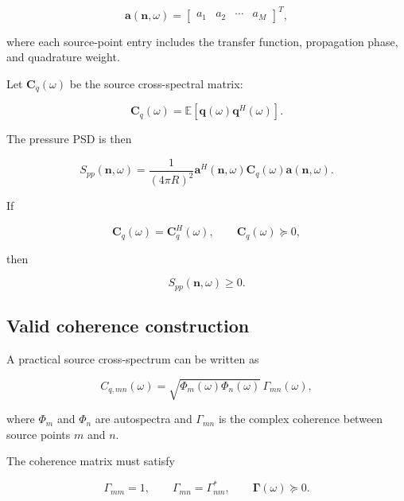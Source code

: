 \documentclass[11pt]{article}
\newcommand{\vect}[1]{\bm{#1}}
\newcommand{\mat}[1]{\bm{#1}}
\newcommand{\E}{\mathbb{E}}
\begin{document}
\begin{equation}
    \vect{a}(\vect{n},\omega)
    =
    \begin{bmatrix}
    a_1 & a_2 & \cdots & a_M
    \end{bmatrix}^{T},
\end{equation}

where each source-point entry includes the transfer function, propagation phase, and quadrature weight.

Let $\mat{C}_q(\omega)$ be the source cross-spectral matrix:

\begin{equation}
    \mat{C}_q(\omega)
    =
    \E
    \left[
        \vect{q}(\omega)\vect{q}^{H}(\omega)
    \right].
\end{equation}

The pressure PSD is then

\begin{equation}
    S_{pp}(\vect{n},\omega)
    =
    \frac{1}{(4\pi R)^2}
    \vect{a}^{H}(\vect{n},\omega)
    \mat{C}_q(\omega)
    \vect{a}(\vect{n},\omega).
\end{equation}

If

\begin{equation}
    \mat{C}_q(\omega)=\mat{C}_q^{H}(\omega),
    \qquad
    \mat{C}_q(\omega)\succeq 0,
\end{equation}

then

\begin{equation}
    S_{pp}(\vect{n},\omega)\geq 0.
\end{equation}

\subsection{Valid coherence construction}

A practical source cross-spectrum can be written as

\begin{equation}
    C_{q,mn}(\omega)
    =
    \sqrt{\Phi_m(\omega)\Phi_n(\omega)}
    \,
    \Gamma_{mn}(\omega),
\end{equation}

where $\Phi_m$ and $\Phi_n$ are autospectra and $\Gamma_{mn}$ is the complex coherence between source points $m$ and $n$.

The coherence matrix must satisfy

\begin{equation}
    \Gamma_{mm}=1,
    \qquad
    \Gamma_{mn}=\Gamma_{nm}^{*},
    \qquad
    \mat{\Gamma}(\omega)\succeq 0.
\end{equation}
\end{document}
